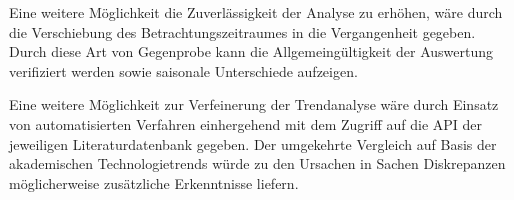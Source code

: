 Eine weitere Möglichkeit die Zuverlässigkeit der Analyse zu erhöhen, wäre durch die Verschiebung des Betrachtungszeitraumes in die Vergangenheit gegeben. Durch diese Art von Gegenprobe kann die Allgemeingültigkeit der Auswertung verifiziert werden sowie saisonale Unterschiede aufzeigen.

Eine weitere Möglichkeit zur Verfeinerung der Trendanalyse wäre durch Einsatz von automatisierten Verfahren einhergehend mit dem Zugriff auf die \ac{API} der jeweiligen Literaturdatenbank gegeben. Der umgekehrte Vergleich auf Basis der akademischen Technologietrends würde zu den Ursachen in Sachen Diskrepanzen möglicherweise zusätzliche Erkenntnisse liefern.